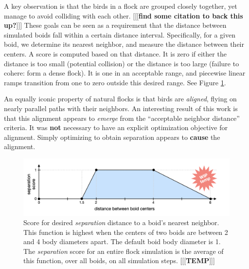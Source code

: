 \documentclass[letterpaper]{article}
\begin{document}
A key observation is that the birds in a flock are grouped closely together, yet manage to avoid colliding with each other. [[[\textbf{find some citation to back this up?}]]] These goals can be seen as a requirement that the distance between simulated boids fall within a certain distance interval. Specifically, for a given boid, we determine its nearest neighbor, and measure the distance between their centers. A score is computed based on that distance. It is zero if either the distance is too small (potential collision) or the distance is too large (failure to cohere: form a dense flock). It is one in an acceptable range, and piecewise linear ramps transition from one to zero outside this desired range. See Figure \ref{fig:SeparationScore}.

An equally iconic property of natural flocks is that birds are \textit{aligned}, flying on nearly parallel paths with their neighbors. An interesting result of this work is that this alignment appears to \textit{emerge} from the ``acceptable neighbor distance'' criteria. It was \textbf{not} necessary to have an explicit optimization objective for alignment. Simply optimizing to obtain separation appears to \textbf{cause} the alignment.


\begin{figure}[t]
    \centering
    \includegraphics[width=0.9\linewidth]{images/temp_sep_score.png}
    \caption{Score for desired \textit{separation} distance to a boid's nearest neighbor. This function is highest when the centers of two boids are between 2 and 4 body diameters apart. The default boid body diameter is 1. The \textit{separation} score for an entire flock simulation is the average of this function, over all boids, on all simulation steps. [[[\textbf{TEMP}]]]}
    \label{fig:SeparationScore}
\end{figure}

\end{document}
